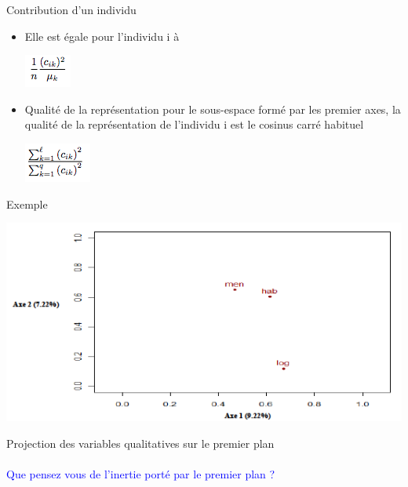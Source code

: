 \documentclass[10pt]{beamer}
\begin{document}

\begin{frame}{ Contribution d’un individu }
 
 \begin{itemize}
 
 \centering  
 \item   Elle est égale pour l'individu i à 
 
 \includegraphics[scale=.8]{AFC12} 


\item Qualité de la représentation pour le sous-espace formé
par les  premier axes, la qualité de la représentation de
l'individu i est le cosinus carré habituel
   
    \includegraphics[scale=.8]{AFC13} 
 \end{itemize}
 
 
\end{frame}


\begin{frame}{Exemple}

 \includegraphics[scale=.5]{ACM1} 


\centering Projection des variables qualitatives sur le premier plan\\~\\

\textcolor{blue}{Que pensez vous de l'inertie porté par le premier plan ?}

\end{frame}
\end{document}
